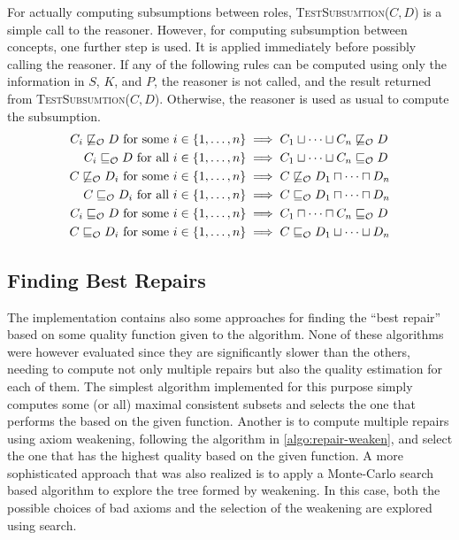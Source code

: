 For actually computing subsumptions between roles, \textsc{TestSubsumtion($C, D$)} is a simple call to the reasoner. However, for computing subsumption between concepts, one further step is used. It is applied immediately before possibly calling the reasoner. If any of the following rules can be computed using only the information in $S$, $K$, and $P$, the reasoner is not called, and the result returned from \textsc{TestSubsumtion($C, D$)}. Otherwise, the reasoner is used as usual to compute the subsumption.
\begin{align*}
  C_i \not\sqsubseteq_\mathcal{O} D \text{ for some } i \in \{ 1, \dots, n \} &\implies C_1 \sqcup \cdots \sqcup C_n \not\sqsubseteq_\mathcal{O} D \\
  C_i \sqsubseteq_\mathcal{O} D \text{ for all } i \in \{ 1, \dots, n \} &\implies C_1 \sqcup \cdots \sqcup C_n \sqsubseteq_\mathcal{O} D \\
  C \not\sqsubseteq_\mathcal{O} D_i \text{ for some } i \in \{ 1, \dots, n \} &\implies C \not\sqsubseteq_\mathcal{O} D_1 \sqcap \cdots \sqcap D_n \\
  C \sqsubseteq_\mathcal{O} D_i \text{ for all } i \in \{ 1, \dots, n \} &\implies C \sqsubseteq_\mathcal{O} D_1 \sqcap \cdots \sqcap D_n \\
  C_i \sqsubseteq_\mathcal{O} D \text{ for some } i \in \{ 1, \dots, n \} &\implies C_1 \sqcap \dots \sqcap C_n \sqsubseteq_\mathcal{O} D \\
  C \sqsubseteq_\mathcal{O} D_i \text{ for some } i \in \{ 1, \dots, n \} &\implies C \sqsubseteq_\mathcal{O} D_1 \sqcup \cdots \sqcup D_n \\
\end{align*}

\subsection{Finding Best Repairs}\label{best-repair-impl}

The implementation contains also some approaches for finding the ``best repair'' based on some quality function given to the algorithm. None of these algorithms were however evaluated since they are significantly slower than the others, needing to compute not only multiple repairs but also the quality estimation for each of them. The simplest algorithm implemented for this purpose simply computes some (or all) maximal consistent subsets and selects the one that performs the based on the given function. Another is to compute multiple repairs using axiom weakening, following the algorithm in \cref{algo:repair-weaken}, and select the one that has the highest quality based on the given function. A more sophisticated approach that was also realized is to apply a Monte-Carlo search \cite{coulom2006efficient} based algorithm to explore the tree formed by weakening. In this case, both the possible choices of bad axioms and the selection of the weakening are explored using search.

